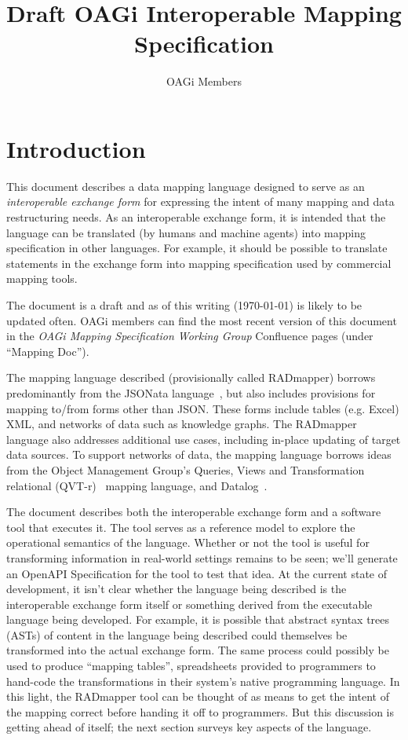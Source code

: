\documentclass[9pt,letterpaper]{article}
\begin{document}
\title{Draft OAGi Interoperable Mapping Specification}
\author{OAGi Members}
\maketitle

\section{Introduction}
This document describes a data mapping language designed to serve as an \textit{interoperable exchange form} for expressing the intent of many mapping and data restructuring needs.
As an interoperable exchange form, it is intended that the language can be translated (by humans and machine agents) into mapping specification in other languages.
For example, it should be possible to translate statements in the exchange form into mapping specification used by commercial mapping tools.

The document is a draft and as of this writing (\today) is likely to be updated often.
OAGi members can find the most recent version of this document in the \textit{OAGi Mapping Specification Working Group} Confluence pages (under ``Mapping Doc'').

The mapping language  described (provisionally called RADmapper) borrows predominantly from the JSONata language~\cite{Jsonata.org2021}, but also includes provisions for mapping to/from forms other than JSON.\@
These forms include tables (e.g. Excel) XML, and networks of data such as knowledge graphs.
The RADmapper language also addresses additional use cases, including in-place updating of target data sources.
To support networks of data, the mapping language borrows ideas from the Object Management Group's Queries, Views and Transformation relational (QVT-r)~\cite{ObjectManagementGroup2016b} mapping language, and Datalog~\cite{Abiteboul1995a}.

The document describes both the interoperable exchange form and a software tool that executes it.
The tool serves as a reference model to explore the operational semantics of the language.
Whether or not the tool is useful for transforming information in real-world settings remains to be seen;
we'll generate an OpenAPI Specification for the tool to test that idea.
At the current state of development, it isn't clear whether the language being described is the interoperable exchange form itself or something derived from the executable language being developed.
For example, it is possible that abstract syntax trees (ASTs) of content in the language being described could themselves be transformed
into the actual exchange form.
The same process could possibly be used to produce ``mapping tables'', spreadsheets provided to programmers to hand-code the transformations
in their system's native programming language. %
In this light, the RADmapper tool can be thought of as means to get the intent of the mapping correct before handing it off to programmers.
But this discussion is getting ahead of itself; the next section surveys key aspects of the language.
\end{document}
